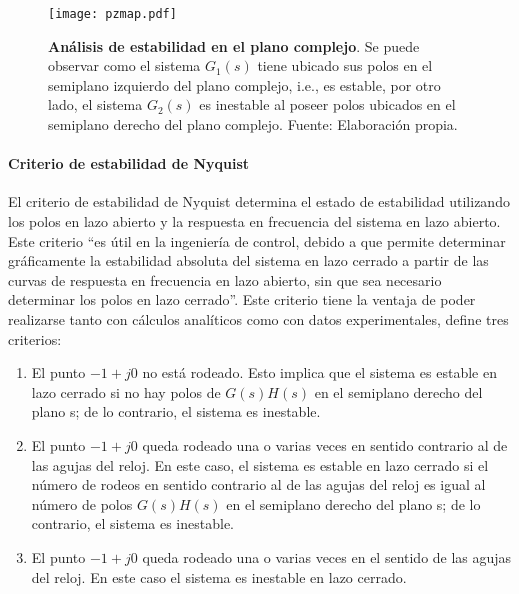                 \begin{figure}[htb]
                    \centering
                    \texttt{[image: pzmap.pdf]}
                    \caption[Ejemplo de análisis de estabilidad en el plano complejo]{\textbf{Análisis de estabilidad en el plano complejo}. Se puede observar como el sistema $G_1(s)$ tiene ubicado sus polos en el semiplano izquierdo del plano complejo, i.e., es estable, por otro lado, el sistema $G_2(s)$ es inestable al poseer polos ubicados en el semiplano derecho del plano complejo. Fuente: Elaboración propia.} 
                    \label{fig:pzmap}
                \end{figure}
            
            \paragraph{Criterio de estabilidad de Nyquist}
                
                El criterio de estabilidad de Nyquist determina el estado de estabilidad utilizando los polos en lazo abierto y la respuesta en frecuencia del sistema en lazo abierto. Este criterio \enquote{es útil en la ingeniería de control, debido a que permite determinar gráficamente la estabilidad absoluta del sistema en lazo cerrado a partir de las curvas de respuesta en frecuencia en lazo abierto, sin que sea necesario determinar los polos en lazo cerrado}\Parencite[p.$\,$446]{ogata2003ingenieria}. Este criterio tiene la ventaja de poder realizarse tanto con cálculos analíticos como con datos experimentales, \textcite{ogata2003ingenieria} define tres criterios:

                \begin{enumerate}[leftmargin=\parindent]
                    \item El punto $-1 + j0$ no está rodeado. Esto implica que el sistema es estable en lazo cerrado si no hay polos de $G(s)H(s)$ en el semiplano derecho del plano s; de lo contrario, el sistema es inestable.
                    \item El punto $-1 + j0$ queda rodeado una o varias veces en sentido contrario al de las agujas
                    del reloj. En este caso, el sistema es estable en lazo cerrado si el número de rodeos en sentido contrario
                    al de las agujas del reloj es igual al número de polos $G(s)H(s)$ en el semiplano derecho
                    del plano s; de lo contrario, el sistema es inestable.


                    \item El punto $-1 + j0$ queda rodeado una o varias veces en el sentido de las agujas del reloj.
                    En este caso el sistema es inestable en lazo cerrado.
                \end{enumerate}
                
